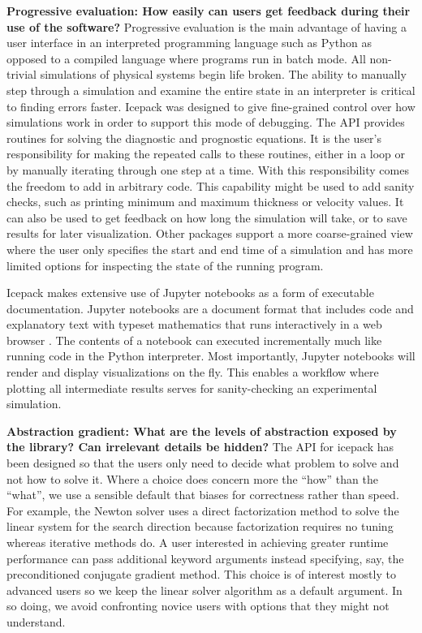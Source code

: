 \documentclass{article}
\theoremstyle{definition}
\theoremstyle{plain}
\begin{document}
\textbf{Progressive evaluation: How easily can users get feedback during their use of the software?}
Progressive evaluation is the main advantage of having a user interface in an interpreted programming language such as Python as opposed to a compiled language where programs run in batch mode.
All non-trivial simulations of physical systems begin life broken.
The ability to manually step through a simulation and examine the entire state in an interpreter is critical to finding errors faster.
Icepack was designed to give fine-grained control over how simulations work in order to support this mode of debugging.
The API provides routines for solving the diagnostic and prognostic equations.
It is the user's responsibility for making the repeated calls to these routines, either in a loop or by manually iterating through one step at a time.
With this responsibility comes the freedom to add in arbitrary code.
This capability might be used to add sanity checks, such as printing minimum and maximum thickness or velocity values.
It can also be used to get feedback on how long the simulation will take, or to save results for later visualization.
Other packages support a more coarse-grained view where the user only specifies the start and end time of a simulation and has more limited options for inspecting the state of the running program.

Icepack makes extensive use of Jupyter notebooks as a form of executable documentation.
Jupyter notebooks are a document format that includes code and explanatory text with typeset mathematics that runs interactively in a web browser \citep{kluyver2016jupyter}.
The contents of a notebook can executed incrementally much like running code in the Python interpreter.
Most importantly, Jupyter notebooks will render and display visualizations on the fly.
This enables a workflow where plotting all intermediate results serves for sanity-checking an experimental simulation.

\textbf{Abstraction gradient: What are the levels of abstraction exposed by the library?
Can irrelevant details be hidden?}
The API for icepack has been designed so that the users only need to decide what problem to solve and not how to solve it.
Where a choice does concern more the ``how'' than the ``what'', we use a sensible default that biases for correctness rather than speed.
For example, the Newton solver uses a direct factorization method to solve the linear system for the search direction because factorization requires no tuning whereas iterative methods do.
A user interested in achieving greater runtime performance can pass additional keyword arguments instead specifying, say, the preconditioned conjugate gradient method.
This choice is of interest mostly to advanced users so we keep the linear solver algorithm as a default argument.
In so doing, we avoid confronting novice users with options that they might not understand.
\end{document}
